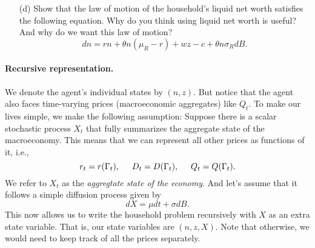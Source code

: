 \documentclass[11pt]{extarticle}
\theoremstyle{plain}
\theoremstyle{definition}
\begin{document}
\begin{enumerate}
\item [(d)] Show that the law of motion of the household's liquid net worth satisfies the following equation. Why do you think using liquid net worth is useful? And why do we want this law of motion?
\begin{equation*}
	dn = rn + \theta n (\mu_R - r) + wz - c + \theta n \sigma_R dB. 
\end{equation*}
\end{enumerate}


\paragraph{Recursive representation.} We denote the agent's individual states by $(n, z)$. But notice that the agent also faces time-varying prices (macroeconomic aggregates) like $Q_t$. To make our lives simple, we make the following assumption: Suppose there is a scalar stochastic process $X_t$ that fully summarizes the aggregate state of the macroeconomy. This means that we can represent all other prices as functions of it, i.e., 
\begin{equation*}
	r_t = r(\Gamma_t), \hspace{5mm}	D_t = D(\Gamma_t), \hspace{5mm}	Q_t = Q(\Gamma_t).
\end{equation*}
We refer to $X_t$ as the \textit{aggregtate state of the economy}. And let's assume that it follows a simple diffusion process given by
\begin{equation*}
	d X = \mu dt + \sigma dB.
\end{equation*}
This now allows us to write the household problem recursively with $X$ as an extra state variable. That is, our state variables are $(n, z, X)$. Note that otherwise, we would need to keep track of all the prices separately. 
\end{document}
